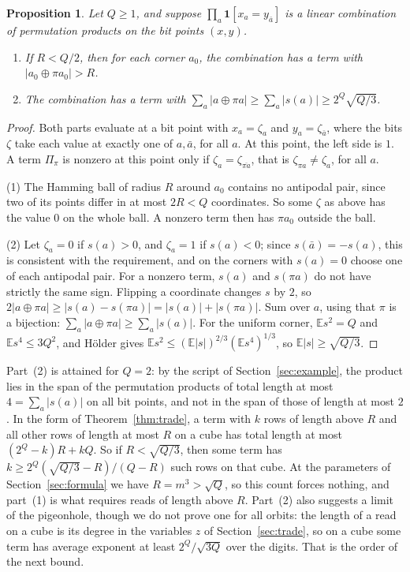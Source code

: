 \documentclass[11pt]{article}
\numberwithin{equation}{section}
\newtheorem{proposition}[theorem]{Proposition}
\theoremstyle{remark}
\begin{document}
\begin{proposition}\label{prop:long}
Let $Q\ge1$, and suppose $\prod_a\mathbf 1[x_a=y_{\bar a}]$ is a linear combination of permutation products on the bit points $(x,y)$.
\begin{enumerate}
\item If $R<Q/2$, then for each corner $a_0$, the combination has a term with $|a_0\oplus\pi a_0|>R$.
\item The combination has a term with $\sum_a|a\oplus\pi a|\ge\sum_a|s(a)|\ge2^Q\sqrt{Q/3}$.
\end{enumerate}
\end{proposition}
\begin{proof}
Both parts evaluate at a bit point with $x_a=\zeta_a$ and $y_a=\zeta_{\bar a}$, where the bits $\zeta$ take each value at exactly one of $a,\bar a$, for all $a$. At this point, the left side is $1$. A term $\Pi_\pi$ is nonzero at this point only if $\zeta_a=\zeta_{\overline{\pi a}}$, that is $\zeta_{\pi a}\ne\zeta_a$, for all $a$.

(1) The Hamming ball of radius $R$ around $a_0$ contains no antipodal pair, since two of its points differ in at most $2R<Q$ coordinates. So some $\zeta$ as above has the value $0$ on the whole ball. A nonzero term then has $\pi a_0$ outside the ball.

(2) Let $\zeta_a=0$ if $s(a)>0$, and $\zeta_a=1$ if $s(a)<0$; since $s(\bar a)=-s(a)$, this is consistent with the requirement, and on the corners with $s(a)=0$ choose one of each antipodal pair. For a nonzero term, $s(a)$ and $s(\pi a)$ do not have strictly the same sign. Flipping a coordinate changes $s$ by $2$, so $2|a\oplus\pi a|\ge|s(a)-s(\pi a)|=|s(a)|+|s(\pi a)|$. Sum over $a$, using that $\pi$ is a bijection: $\sum_a|a\oplus\pi a|\ge\sum_a|s(a)|$. For the uniform corner, $\mathbb Es^2=Q$ and $\mathbb Es^4\le3Q^2$, and H\"older gives $\mathbb Es^2\le(\mathbb E|s|)^{2/3}(\mathbb Es^4)^{1/3}$, so $\mathbb E|s|\ge\sqrt{Q/3}$.
\end{proof}

Part~(2) is attained for $Q=2$: by the script of Section~\ref{sec:example}, the product lies in the span of the permutation products of total length at most $4=\sum_a|s(a)|$ on all bit points, and not in the span of those of length at most $2$. In the form of Theorem~\ref{thm:trade}, a term with $k$ rows of length above $R$ and all other rows of length at most $R$ on a cube has total length at most $(2^Q-k)R+kQ$. So if $R<\sqrt{Q/3}$, then some term has $k\ge2^Q(\sqrt{Q/3}-R)/(Q-R)$ such rows on that cube. At the parameters of Section~\ref{sec:formula} we have $R=m^3>\sqrt Q$, so this count forces nothing, and part~(1) is what requires reads of length above $R$. Part~(2) also suggests a limit of the pigeonhole, though we do not prove one for all orbits: the length of a read on a cube is its degree in the variables $z$ of Section~\ref{sec:trade}, so on a cube some term has average exponent at least $2^Q/\sqrt{3Q}$ over the digits. That is the order of the next bound.
\end{document}
